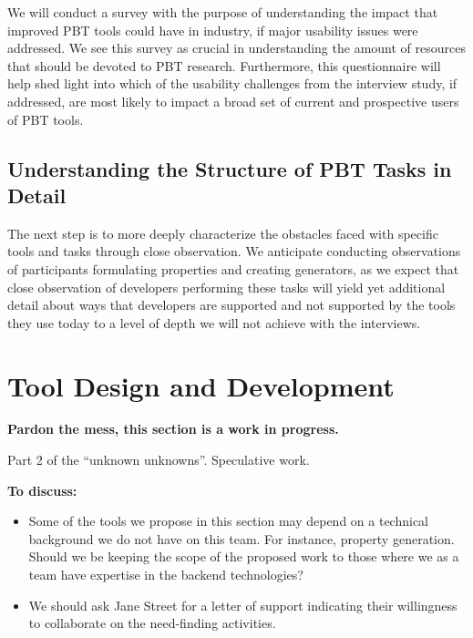 We will conduct a survey with the purpose of understanding the impact that 
improved PBT tools could have in industry, if major usability issues were 
addressed. We see this survey as crucial in understanding the amount of 
resources that should be devoted to PBT research. Furthermore, this 
questionnaire will help shed light into which of the usability challenges from 
the interview study, if addressed, are most likely to impact a broad set of 
current and prospective users of PBT tools.

\subsection{Understanding the Structure of PBT Tasks in Detail}

The next step is to more deeply characterize the obstacles faced with specific 
tools and tasks through close observation. We anticipate conducting observations 
of participants formulating properties and creating generators, as we expect 
that close observation of developers performing these tasks will yield yet 
additional detail about ways that developers are supported and not supported by 
the tools they use today to a level of depth we will not achieve with the 
interviews.

\section{Tool Design and Development}

\textbf{Pardon the mess, this section is a work in progress.}

Part 2 of the ``unknown unknowns''.
Speculative work.

\textbf{To discuss:}

\begin{itemize}

\item Some of the tools we propose in this section may depend on a technical 
background we do not have on this team. For instance, property generation.  
Should we be keeping the scope of the proposed work to those where we as a team 
have expertise in the backend technologies?

\item We should ask Jane Street for a letter of support indicating their 
willingness to collaborate on the need-finding activities.

\end{itemize}



